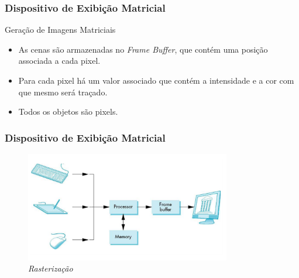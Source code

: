 \documentclass{beamer}
\begin{document}

\begin{frame}
\frametitle{Dispositivo de Exibição Matricial}
	
	\begin{block}{Geração de Imagens Matriciais}
		\begin{itemize}
			\item As cenas são armazenadas no \textit{Frame Buffer}, que contém uma posição associada a cada pixel.
			\item Para cada pixel há um valor associado que contém a intensidade e a cor com que mesmo será traçado.
			\item Todos os objetos são pixels.
		\end{itemize}
	\end{block}

\end{frame}



\begin{frame}
\frametitle{Dispositivo de Exibição Matricial}

	\begin{figure}[!h]
		\begin{center}
			\includegraphics[width=0.8\textwidth]{Figures/framebuffer}
			\caption{\textit{Rasterização}}
		\end{center}
	\end{figure}


\end{frame}

\end{document}
